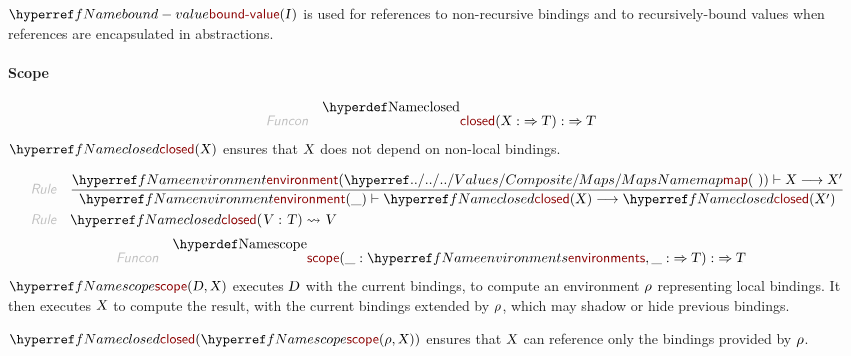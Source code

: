 $\NAMEREF{bound-value}
    (  \VAR{I} )$ is used for references to non-recursive bindings and to
   recursively-bound values when references are encapsulated in abstractions.

\paragraph{Scope}\hypertarget{scope}{}\label{scope}

\begin{align*}
  \KEY{Funcon} \quad
  & \NAMEDECL{closed}(
                       \VAR{X} :  \TO \VAR{T}) 
    :  \TO \VAR{T} 
\end{align*}
$\NAMEREF{closed}
    (  \VAR{X} )$ ensures that $\VAR{X}$ does not depend on non-local bindings.

\begin{align*}
  \KEY{Rule} \quad
    & \frac{
      \NAMEREF{environment} (  \NAMEHYPER{../../../Values/Composite}{Maps}{map}
                                   (   \  ) ) \vdash \VAR{X} \TRANS 
        \VAR{X}'
      }{
      \NAMEREF{environment} (  \_ ) \vdash \NAMEREF{closed}
                    (  \VAR{X} ) \TRANS 
        \NAMEREF{closed}
          (  \VAR{X}' )
      }
\\
  \KEY{Rule} \quad
    & \NAMEREF{closed}
        (  \VAR{V} : \VAR{T} ) \leadsto 
        \VAR{V}
\end{align*}
\begin{align*}
  \KEY{Funcon} \quad
  & \NAMEDECL{scope}(
                       \_ : \NAMEREF{environments}, \_ :  \TO \VAR{T}) 
    :  \TO \VAR{T} 
\end{align*}
$\NAMEREF{scope}
    (  \VAR{D}, 
           \VAR{X} )$ executes $\VAR{D}$ with the current bindings, to compute an environment
  $\VAR{\ensuremath{\rho}}$ representing local bindings. It then executes $\VAR{X}$ to compute the result,
  with the current bindings extended by $\VAR{\ensuremath{\rho}}$, which may shadow or hide previous
  bindings.

$\NAMEREF{closed}
    (  \NAMEREF{scope}
            (  \VAR{\ensuremath{\rho}}, 
                   \VAR{X} ) )$ ensures that $\VAR{X}$ can reference only the bindings
  provided by $\VAR{\ensuremath{\rho}}$.

